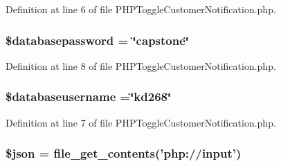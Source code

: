 Definition at line 6 of file P\-H\-P\-Toggle\-Customer\-Notification.\-php.

\hypertarget{_p_h_p_toggle_customer_notification_8php_a1a07536b6a5f43f2d8f826bd2ee6c91a}{
\subsubsection[{\$databasepassword}]{\setlength{\rightskip}{0pt plus 5cm}\$databasepassword = \char`\"{}capstone\char`\"{}}}\label{_p_h_p_toggle_customer_notification_8php_a1a07536b6a5f43f2d8f826bd2ee6c91a}


Definition at line 8 of file P\-H\-P\-Toggle\-Customer\-Notification.\-php.

\hypertarget{_p_h_p_toggle_customer_notification_8php_a251bf75f510d7c8b556c65d7c30e911f}{
\subsubsection[{\$databaseusername}]{\setlength{\rightskip}{0pt plus 5cm}\$databaseusername =\char`\"{}kd268\char`\"{}}}\label{_p_h_p_toggle_customer_notification_8php_a251bf75f510d7c8b556c65d7c30e911f}


Definition at line 7 of file P\-H\-P\-Toggle\-Customer\-Notification.\-php.

\hypertarget{_p_h_p_toggle_customer_notification_8php_acedd13b51401130848ce18f4d5c52605}{
\subsubsection[{\$json}]{\setlength{\rightskip}{0pt plus 5cm}\$json = file\-\_\-get\-\_\-contents('php\-://input')}}\label{_p_h_p_toggle_customer_notification_8php_acedd13b51401130848ce18f4d5c52605}


